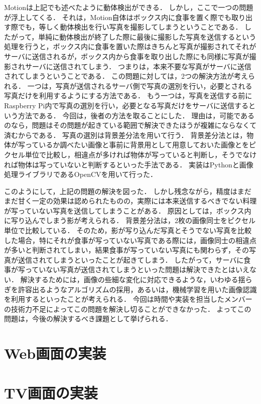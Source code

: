 \documentclass[../report]{subfiles}
\begin{document}
Motionは上記でも述べたように動体検出ができる．
しかし，ここで一つの問題が浮上してくる．
それは，Motion自体はボックス内に食事を置く際でも取り出す際でも，等しく動体検出を行い写真を撮影してしまうということである．
したがって，単純に動体検出が終了した際に最後に撮影した写真を送信するという処理を行うと，ボックス内に食事を置いた際はきちんと写真が撮影されてそれがサーバに送信されるが，ボックス内から食事を取り出した際にも同様に写真が撮影されサーバに送信されてしまう．
つまりは，本来不要な写真がサーバに送信されてしまうということである．
この問題に対しては，2つの解決方法が考えられる．
一つは，写真が送信されるサーバ側で写真の選別を行い，必要とされる写真だけを利用するようにする方法である．
もう一つは，写真を送信する前にRaspberry Pi内で写真の選別を行い，必要となる写真だけをサーバに送信するという方法である．
今回は，後者の方法を取ることにした．
理由は，可能であるのなら，問題はその問題が起きている範囲で解決できたほうが複雑にならなくて済むからである．
写真の選別は背景差分法を用いて行う．
背景差分法とは，物体が写っているか調べたい画像と事前に背景用として用意しておいた画像とをピクセル単位で比較し，相違点が多ければ物体が写っていると判断し，そうでなければ物体は写っていないと判断するといった手法である．
実装はPythonと画像処理ライブラリであるOpenCVを用いて行った．

このようにして，上記の問題の解決を図った．
しかし残念ながら，精度はまだまだ甘く一定の効果は認められたものの，実際には本来送信するべきでない料理が写っていない写真を送信してしまうことがある．
原因としては，ボックス内に写り込んでしまう影が考えられる．
背景差分法は，2枚の画像同士をピクセル単位で比較している．
そのため，影が写り込んだ写真とそうでない写真を比較した場合，特にそれが食事が写っていない写真である際には，画像同士の相違点が多いと判断されてしまい，結果食事が写っていない写真にも関わらず，その写真が送信されてしまうといったことが起きてしまう．
したがって，サーバに食事が写っていない写真が送信されてしまうといった問題は解決できたとはいえない．
解決するためには，画像の些細な変化に対応できるような，いわゆる揺らぎを許容出るようなアルゴリズムの採用，あるいは，機械学習を用いた画像認識を利用するといったことが考えられる．
今回は時間や実装を担当したメンバーの技術力不足によってこの問題を解決し切ることができなかった．
よってこの問題は，今後の解決するべき課題として挙げられる．


\section{Web画面の実装}


\section{TV画面の実装}
\end{document}
